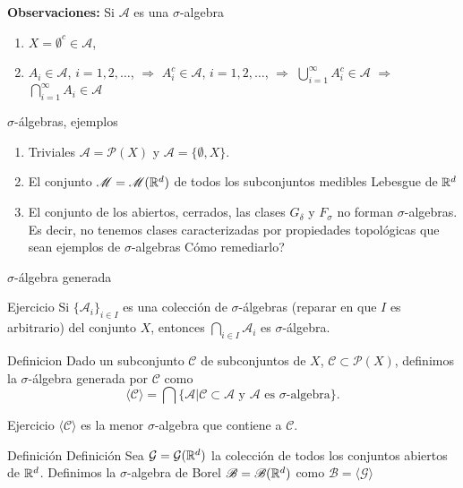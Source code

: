 \textbf{Observaciones:} Si $\mathscr{A}$ es una $\sigma$-algebra 
\begin{enumerate}
 \item $X=\emptyset^c\in\mathscr{A}$,
 \item  $A_i\in \mathscr{A}$, $i=1,2,\ldots$, $\Rightarrow$
 $A_i^c\in \mathscr{A}$, $i=1,2,\ldots$, $\Rightarrow$ $\bigcup_{i=1}^{\infty}A_i^c\in\mathscr{A}$  $\Rightarrow$ $\bigcap_{i=1}^{\infty}A_i\in\mathscr{A}$ 
 \end{enumerate}



$\sigma$-álgebras, ejemplos
 \begin{ejemplo}{}
\begin{enumerate}
 \item  Triviales $\mathscr{A}=\mathcal{P}(X)$ y $\mathscr{A}=\{\emptyset,X\}$.
 \item  El conjunto $\mathscr{M}=\mathscr{M}(\mathbb{R}^d)$ de todos los subconjuntos medibles Lebesgue de $\mathbb{R}^d$
 \item El conjunto de los abiertos, cerrados, las clases $G_{\delta}$ y $F_{\sigma}$ no forman $\sigma$-algebras. Es decir, no tenemos clases caracterizadas por propiedades topológicas que sean ejemplos de $\sigma$-algebras    Cómo remediarlo? 
 
\end{enumerate}
 
 \end{ejemplo}



 $\sigma$-álgebra generada


{Ejercicio} Si  $\{\mathscr{A}_i\}_{i\in I}$ es una colección de $\sigma$-álgebras  (reparar en que $I$ es arbitrario) del conjunto $X$, entonces $\bigcap_{i\in I}\mathscr{A}_i$ es $\sigma$-álgebra.



{Definicion} Dado un subconjunto $\mathcal{C}$ de subconjuntos de $X$, $\mathcal{C}\subset\mathcal{P}(X)$, definimos la $\sigma$-álgebra generada por $\mathcal{C}$ como
\[\langle\mathcal{C}\rangle=\bigcap\{\mathscr{A}| \mathcal{C}\subset \mathscr{A}\text{ y } \mathscr{A} \text{ es $\sigma$-algebra}\}.\]


{Ejercicio} $\langle\mathcal{C}\rangle$ es la menor $\sigma$-algebra que contiene a $ \mathcal{C}$.




Definición
 {Definición} Sea $\mathcal{G}=\mathcal{G}(\mathbb{R}^d)$ la colección de todos los conjuntos abiertos de $\mathbb{R}^d$. Definimos la $\sigma$-algebra de Borel  $\mathscr{B}=\mathscr{B}(\mathbb{R}^d)$ como  $\mathscr{B}=\langle \mathcal{G} \rangle$ 


